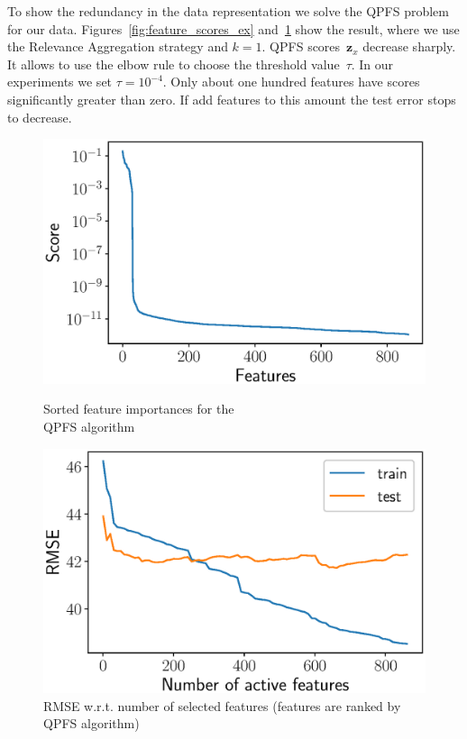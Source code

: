 \documentclass[12pt,oneside]{article}
\theoremstyle{definition}
\newcommand{\bz}{\mathbf{z}}
\begin{document}
To show the redundancy in the data representation we solve the QPFS problem for our data.
Figures~\ref{fig:feature_scores_ex} and~\ref{fig:train_test_qpfs} show the result, where we use the Relevance Aggregation strategy and $k = 1$.
QPFS scores~$\bz_x$ decrease sharply.
It allows to use the elbow rule to choose the threshold value~$\tau$. 
In our experiments we set $\tau = 10^{-4}$. 
Only about one hundred features have scores significantly greater than zero.
If add features to this amount the test error stops to decrease.
\begin{figure}[h]
	\begin{minipage}{.5\linewidth}
		\centering
		\includegraphics[width=\linewidth]{figs/feature_scores_ex.eps}
		\caption{Sorted feature importances for the \\ QPFS algorithm}
		\label{fig:feature_scores_ex}
	\end{minipage}%
	\begin{minipage}{.5\linewidth}
	\centering
	\includegraphics[width=\linewidth]{figs/train_test_qpfs.eps}
	\caption{RMSE w.r.t. number of selected features (features are ranked by QPFS algorithm)}
	\label{fig:train_test_qpfs}
	\end{minipage}
\end{figure}
\end{document}
